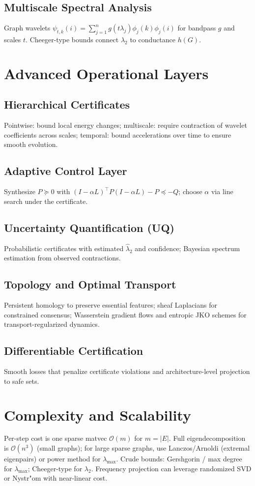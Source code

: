 \documentclass[11pt]{article}
\begin{document}
\subsection{Multiscale Spectral Analysis}
Graph wavelets $\psi_{t,k}(i)=\sum_{j=1}^n g(t\lambda_j)\phi_j(k)\phi_j(i)$ for bandpass $g$ and scales $t$. Cheeger-type bounds connect $\lambda_2$ to conductance $h(G)$.

\section{Advanced Operational Layers}
\subsection{Hierarchical Certificates}
Pointwise: bound local energy changes; multiscale: require contraction of wavelet coefficients across scales; temporal: bound accelerations over time to ensure smooth evolution.
\subsection{Adaptive Control Layer}
Synthesize $P\succeq 0$ with $(I-\alpha L)^\top P(I-\alpha L)-P\preceq -Q$; choose $\alpha$ via line search under the certificate. 
\subsection{Uncertainty Quantification (UQ)}
Probabilistic certificates with estimated $\hat\lambda_2$ and confidence; Bayesian spectrum estimation from observed contractions.
\subsection{Topology and Optimal Transport}
Persistent homology to preserve essential features; sheaf Laplacians for constrained consensus; Wasserstein gradient flows and entropic JKO schemes for transport-regularized dynamics.
\subsection{Differentiable Certification}
Smooth losses that penalize certificate violations and architecture-level projection to safe sets.

\section{Complexity and Scalability}
Per-step cost is one sparse matvec $\mathcal O(m)$ for $m=|E|$. Full eigendecomposition is $\mathcal O(n^3)$ (small graphs); for large sparse graphs, use Lanczos/Arnoldi (extremal eigenpairs) or power method for $\lambda_{\max}$. Crude bounds: Gershgorin / max degree for $\lambda_{\max}$; Cheeger-type for $\lambda_2$. Frequency projection can leverage randomized SVD or Nystr"om with near-linear cost.
\end{document}
